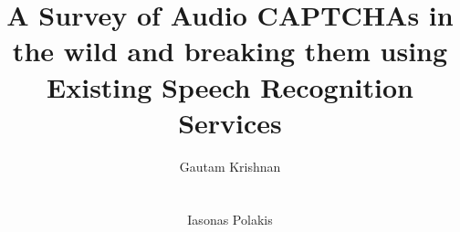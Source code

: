 \documentclass[conference, twocolumn]{sig-alternate-05-2015}
\begin{document}
\title{A Survey of Audio CAPTCHAs in the wild and breaking them using Existing Speech Recognition Services}
\author{
\alignauthor Gautam Krishnan\\
\\
\\
%
\alignauthor Iasonas Polakis\\
\\
\\
}

\maketitle


















\end{document}
